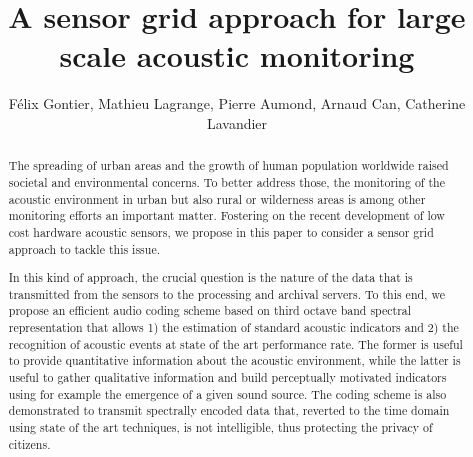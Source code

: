 \documentclass[final,3p,times,twocolumn]{elsarticle}
\begin{document}
\begin{frontmatter}




\title{A sensor grid approach for large scale acoustic monitoring}


\author{F\'elix Gontier, Mathieu Lagrange, Pierre Aumond, Arnaud Can, Catherine Lavandier}

\address{felix.gontier@reseau.eseo.fr}

\begin{abstract}

The spreading of urban areas and the growth of human population worldwide raised societal and environmental concerns. To better address those, the monitoring of the acoustic environment in urban but also rural or wilderness areas is among other monitoring efforts an important matter. Fostering on the recent development of low cost hardware acoustic sensors, we propose in this paper to consider a sensor grid approach to tackle this issue.

In this kind of approach, the crucial question is the nature of the data that is transmitted from the sensors to the processing and archival servers. To this end, we propose an efficient audio coding scheme based on third octave band spectral representation that allows 1) the estimation of standard acoustic indicators and 2) the recognition of acoustic events at state of the art performance rate. The former is useful to provide quantitative information about the acoustic environment, while the latter is useful to gather qualitative information and build perceptually motivated indicators using for example the emergence of a given sound source. The coding scheme is also demonstrated to transmit spectrally encoded data that, reverted to the time domain using state of the art techniques, is not intelligible, thus protecting the privacy of citizens.


\end{abstract}
\end{frontmatter}
\end{document}
